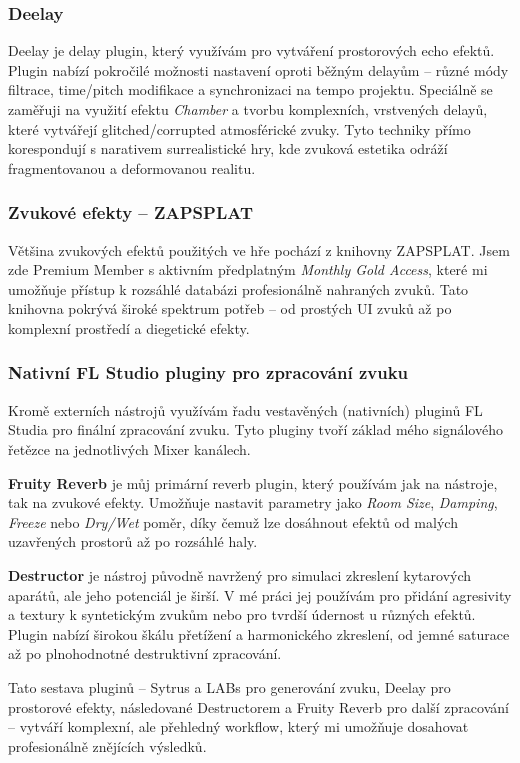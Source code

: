 \subsubsection{Deelay}
Deelay je delay plugin, který využívám pro vytváření prostorových echo efektů. Plugin nabízí pokročilé možnosti nastavení oproti běžným delayům -- různé módy filtrace, time/pitch modifikace a synchronizaci na tempo projektu. Speciálně se zaměřuji na využití efektu \emph{Chamber} a tvorbu komplexních, vrstvených delayů, které vytvářejí glitched/corrupted atmosférické zvuky. Tyto techniky přímo korespondují s narativem surrealistické hry, kde zvuková estetika odráží fragmentovanou a deformovanou realitu.

\subsubsection{Zvukové efekty -- ZAPSPLAT}
Většina zvukových efektů použitých ve hře pochází z knihovny ZAPSPLAT. Jsem zde Premium Member s aktivním předplatným \emph{Monthly Gold Access}, které mi umožňuje přístup k rozsáhlé databázi profesionálně nahraných zvuků. Tato knihovna pokrývá široké spektrum potřeb -- od prostých UI zvuků až po komplexní prostředí a diegetické efekty.

\subsubsection{Nativní FL Studio pluginy pro zpracování zvuku}
Kromě externích nástrojů využívám řadu vestavěných (nativních) pluginů FL Studia pro finální zpracování zvuku. Tyto pluginy tvoří základ mého signálového řetězce na jednotlivých Mixer kanálech.

\textbf{Fruity Reverb} je můj primární reverb plugin, který používám jak na nástroje, tak na zvukové efekty. Umožňuje nastavit parametry jako \emph{Room Size}, \emph{Damping}, \emph{Freeze} nebo \emph{Dry/Wet} poměr, díky čemuž lze dosáhnout efektů od malých uzavřených prostorů až po rozsáhlé haly.

\textbf{Destructor} je nástroj původně navržený pro simulaci zkreslení kytarových aparátů, ale jeho potenciál je širší. V mé práci jej používám pro přidání agresivity a textury k syntetickým zvukům nebo pro tvrdší údernost u různých efektů. Plugin nabízí širokou škálu přetížení a harmonického zkreslení, od jemné saturace až po plnohodnotné destruktivní zpracování.

Tato sestava pluginů -- Sytrus a LABs pro generování zvuku, Deelay pro prostorové efekty, následované Destructorem a Fruity Reverb pro další zpracování -- vytváří komplexní, ale přehledný workflow, který mi umožňuje dosahovat profesionálně znějících výsledků.

